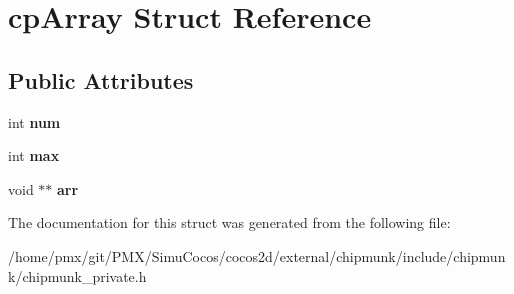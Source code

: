 \hypertarget{structcpArray}{}\section{cp\+Array Struct Reference}
\label{structcpArray}
\subsection*{Public Attributes}
\begin{DoxyCompactItemize}
\item 
\mbox{\label{structcpArray_a7e4b3a68ae2f403be9cfdac83f1059e5}} 
int {\bfseries num}
\item 
\mbox{\label{structcpArray_af716e2d8fd33cdb3278b123b6f5479e2}} 
int {\bfseries max}
\item 
\mbox{\label{structcpArray_a5a250b62e2c1ac90feca484a66e5e835}} 
void $\ast$$\ast$ {\bfseries arr}
\end{DoxyCompactItemize}


The documentation for this struct was generated from the following file\+:\begin{DoxyCompactItemize}
\item 
/home/pmx/git/\+P\+M\+X/\+Simu\+Cocos/cocos2d/external/chipmunk/include/chipmunk/chipmunk\+\_\+private.\+h\end{DoxyCompactItemize}
